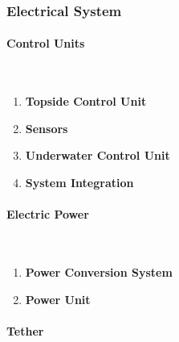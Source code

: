 \subsubsection{Electrical System}

\paragraph{Control Units} \ \\
\vspace{-0.5cm}

\vspace{-\baselineskip}
\begin{enumerate}[label=(\roman*)]
    \setlength{\itemsep}{0pt}
    \item \textbf{Topside Control Unit}
    \item \textbf{Sensors}
    \item \textbf{Underwater Control Unit}
    \item \textbf{System Integration}
\end{enumerate}

\paragraph{Electric Power} \ \\
\vspace{-0.5cm}

\vspace{-\baselineskip}
\begin{enumerate}[label=(\roman*)]
    \setlength{\itemsep}{0pt}
    \item \textbf{Power Conversion System}
    \item \textbf{Power Unit}
\end{enumerate}

\paragraph{Tether} \ \\
\vspace{-0.5cm}